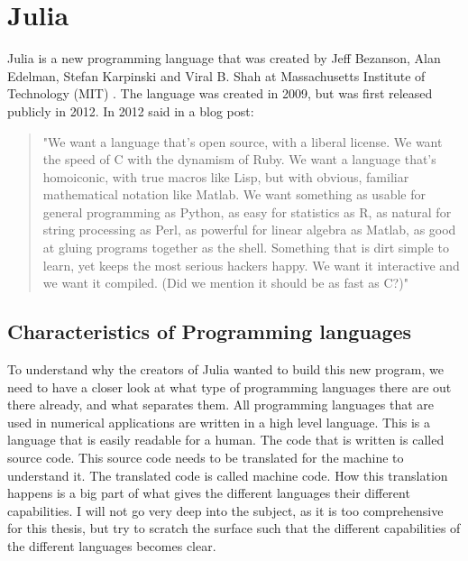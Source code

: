 \chapter{Julia}
\label{ch:Julia}
Julia is a new programming language that was created by Jeff Bezanson, Alan Edelman, Stefan Karpinski and Viral B. Shah at Massachusetts Institute of Technology (MIT) \citep{juliaLab}. The language was created in 2009, but was first released publicly in 2012. In 2012 \cite{juliaBlogRelease2012} said in a blog post:
\begin{quotation}
"We want a language that’s open source, with a liberal license. We want the speed of C with the dynamism of Ruby. We want a language that’s homoiconic, with true macros like Lisp, but with obvious, familiar mathematical notation like Matlab. We want something as usable for general programming as Python, as easy for statistics as R, as natural for string processing as Perl, as powerful for linear algebra as Matlab, as good at gluing programs together as the shell. Something that is dirt simple to learn, yet keeps the most serious hackers happy. We want it interactive and we want it compiled. (Did we mention it should be as fast as C?)"
\end{quotation}

\section{Characteristics of Programming languages}
To understand why the creators of Julia wanted to build this new program, we need to have a closer look at what type of programming languages there are out there already, and what separates them. All programming languages that are used in numerical applications are written in a high level language. This is a language that is easily readable for a human. The code that is written is called source code. This source code needs to be translated for the machine to understand it. The translated code is called machine code. How this translation happens is a big part of what gives the different languages their different capabilities. I will not go very deep into the subject, as it is too comprehensive for this thesis, but try to scratch the surface such that the different capabilities of the different languages becomes clear.

